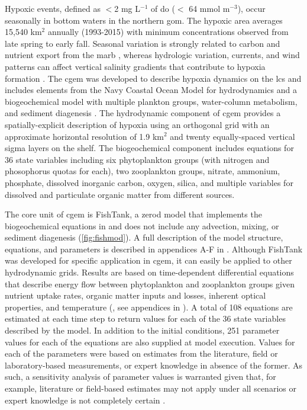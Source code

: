 \documentclass[review]{elsarticle}\usepackage[]{graphicx}\usepackage[]{color}
\begin{document}
Hypoxic events, defined  as $<$2 mg L$^{-1}$ of \ac{do} ($<$ 64 mmol m$^{-3}$), occur seasonally in bottom waters in the northern \ac{gom}.  The hypoxic area averages 15,540 km$^2$ annually (1993-2015) with minimum concentrations observed from late spring to early fall.  Seasonal variation is strongly related to carbon and nutrient export from the \ac{marb} \citep{Lohrenz08,Bianchi10}, whereas hydrologic variation, currents, and wind patterns can affect vertical salinity gradients that contribute to hypoxia formation \citep{Wiseman97,Paerl98,Obenour15}. The \ac{cgem} was developed to describe hypoxia dynamics on the \ac{lcs} and includes elements from the Navy Coastal Ocean Model \citep{Martin00} for hydrodynamics and a biogeochemical model with multiple plankton groups, water-column metabolism, and sediment diagenesis \citep{Eldridge10}.  The hydrodynamic component of \ac{cgem} provides a spatially-explicit description of hypoxia using an orthogonal grid with an approximate horizontal resolution of 1.9 km$^2$ and twenty equally-spaced vertical sigma layers on the shelf.  The biogeochemical component includes equations for 36 state variables including six phytoplankton groups (with nitrogen and phosophorus quotas for each), two zooplankton groups, nitrate, ammonium, phosphate, dissolved inorganic carbon, oxygen, silica, and multiple variables for dissolved and particulate organic matter from different sources.

The core unit of \ac{cgem} is FishTank, a \ac{zerod} model that implements the biogeochemical equations in \citet{Eldridge10} and does not include any advection, mixing, or sediment diagenesis (\cref{fig:fishmod}). A full description of the model structure, equations, and parameters is described in appendices A-F in \citet{Lehrter17}. Although FishTank was developed for specific application in \ac{cgem}, it can easily be applied to other hydrodynamic grids. Results are based on time-dependent differential equations that describe energy flow between phytoplankton and zooplankton groups given nutrient uptake rates, organic matter inputs and losses, inherent optical properties, and temperature (\citealt{Penta08,Eldridge10}, see appendices in \citealt{Lehrter17}). A total of 108 equations are estimated at each time step to return values for each of the 36 state variables described by the model.  In addition to the initial conditions, 251 parameter values for each of the equations are also supplied at model execution. Values for each of the parameters were based on estimates from the literature, field or laboratory-based measurements, or expert knowledge in absence of the former.  As such, a sensitivity analysis of parameter values is warranted given that, for example, literature or field-based estimates may not apply under all scenarios or expert knowledge is not completely certain \citep{Refsgaard07}.
\end{document}

